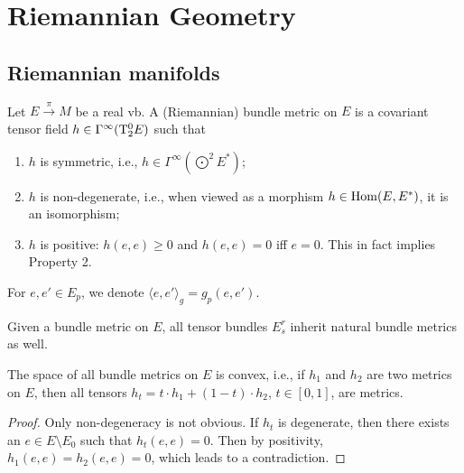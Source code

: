 
\clearpage
\chapter{Riemannian Geometry \texorpdfstring{\ucmark}{}}

\section{Riemannian manifolds}\label{sec: Riemannian mfds}


\begin{defn}
    Let $E\overset\pi\to M$ be a real \gls{vb}. A (Riemannian) bundle metric on $E$ is a covariant tensor field $h\in\Gamma^\infty(\mathrm{T}^0_2 E)$ such that
    \begin{enumerate}
        \item $h$ is symmetric, i.e., $h\in\Gamma^\infty\left(\bigodot^2 E^\ast\right)$;
        \item $h$ is non-degenerate, i.e., when viewed as a morphism $h\in\operatorname{Hom}(E,E^\ast)$, it is an isomorphism;
        \item $h$ is positive: $h(e,e)\geq 0$ and $h(e,e)=0$ iff $e=0$. This in fact implies Property 2.
    \end{enumerate}
    For $e,e'\in E_p$, we denote $\langle e,e'\rangle_g=g_p(e,e')$.
\end{defn}

Given a bundle metric on $E$, all tensor bundles $E^r_s$ inherit natural bundle metrics as well.

\begin{prop}
    The space of all bundle metrics on $E$ is convex, i.e., if $h_1$ and $h_2$ are two metrics on $E$, then all tensors $h_t=t \cdot h_1+(1-t)\cdot h_2$, $t\in[0,1]$, are metrics.
\end{prop}
\begin{proof}
    Only non-degeneracy is not obvious. If $h_t$ is degenerate, then there exists an $e\in E\setminus E_0$ such that $h_t(e,e)=0$. Then by positivity, $h_1(e,e)=h_2(e,e)=0$, which leads to a contradiction.
\end{proof}

